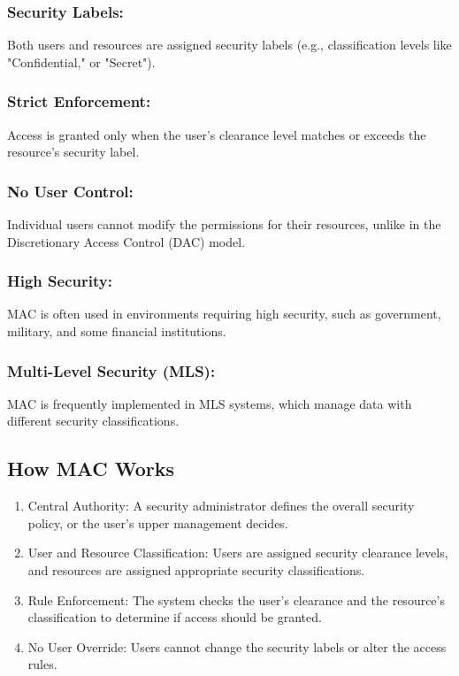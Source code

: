 \subsubsection{\textbf{Security Labels:}}
Both users and resources are assigned security labels (e.g., classification levels like "Confidential," or "Secret").

\subsubsection{\textbf{Strict Enforcement:}}
Access is granted only when the user's clearance level matches or exceeds the resource's security label.

\subsubsection{\textbf{No User Control:}}
Individual users cannot modify the permissions for their resources, unlike in the Discretionary Access Control (DAC) model.

\subsubsection{\textbf{High Security:}}
MAC is often used in environments requiring high security, such as government, military, and some financial institutions.

\subsubsection{\textbf{Multi-Level Security (MLS):}}
MAC is frequently implemented in MLS systems, which manage data with different security classifications.

\subsection{How MAC Works}
\begin{enumerate}
    \item Central Authority: A security administrator defines the overall security policy, or the user's upper management decides.
    \item User and Resource Classification: Users are assigned security clearance levels, and resources are assigned appropriate security classifications.
    \item Rule Enforcement: The system checks the user's clearance and the resource's classification to determine if access should be granted.
    \item No User Override: Users cannot change the security labels or alter the access rules.
\end{enumerate}

